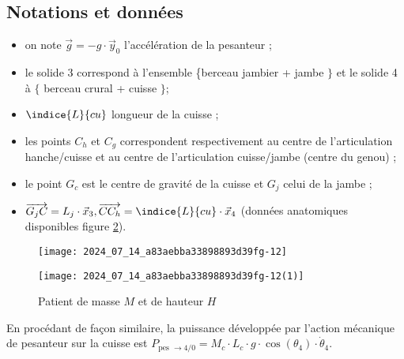 \subsection*{Notations et données }
\begin{itemize}
 \item on note $\vec{g}=-g \cdot \vec{y}_{0}$ l'accélération de la pesanteur ;
 \item  le solide 3 correspond à l'ensemble \{berceau jambier + jambe $\}$ et le solide 4 à $\{$ berceau crural + cuisse $\}$;
  \item $\indice{L}{cu}$ longueur de la cuisse ;
 \item les points $C_{h}$ et $C_{g}$ correspondent respectivement au centre de l'articulation hanche/cuisse et au centre de l'articulation cuisse/jambe (centre du genou) ;
  \item le point $G_{c}$ est le centre de gravité de la cuisse et $G_{j}$ celui de la jambe ;
  \item $\overrightarrow{G_{j} C}=L_{j} \cdot \vec{x}_{3}, \overrightarrow{C C_{h}}=\indice{L}{cu} \cdot \vec{x}_{4}$ (données anatomiques disponibles figure \ref{fig:ccs_mp_2024:fig:20}). 
\end{itemize}

\begin{figure}[!h]\centering
\texttt{[image: 2024\_07\_14\_a83aebba33898893d39fg-12]}

\caption{\label{fig:ccs_mp_2024:fig:19}}
\end{figure}
\begin{figure}[!h]\centering
\texttt{[image: 2024\_07\_14\_a83aebba33898893d39fg-12(1)]}

\caption{\label{fig:ccs_mp_2024:fig:20}Patient de masse $M$ et de hauteur $H$}
\end{figure}



En procédant de façon similaire, la puissance développée par l'action mécanique de pesanteur sur la cuisse est $P_{\text {pes } \rightarrow 4 / 0}=M_{c} \cdot L_{c} \cdot g \cdot \cos \left(\theta_{4}\right) \cdot \dot{\theta}_{4}$.

